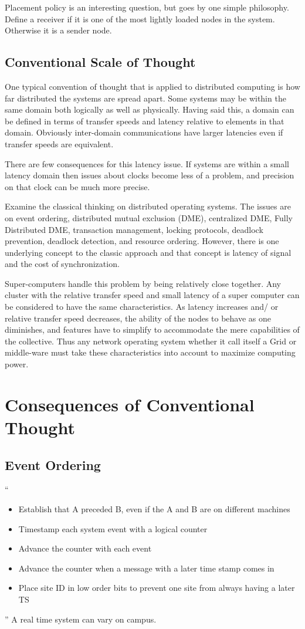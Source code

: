 \documentclass[11pt]{article}
\begin{document}
Placement policy is an interesting question, but goes by one simple philosophy.  Define a receiver if it is one of the most lightly loaded nodes in the system.   Otherwise it is a sender node.  

\subsection {Conventional Scale of Thought}
One typical convention of thought that is applied to distributed computing is how far distributed the systems are spread apart.  Some systems may be within the same domain both logically as well as physically.    Having said this, a domain can be defined in terms of transfer speeds and latency relative to elements in that domain.   Obviously inter-domain communications have larger latencies even if transfer speeds are equivalent.     

There are few consequences for this latency issue.  If systems are within a small latency domain then issues about clocks become less of a problem, and precision on that clock can be much more precise.  

Examine the classical thinking on distributed operating systems.  The issues are on event ordering, distributed mutual exclusion (DME), centralized DME, Fully Distributed DME,  transaction management,  locking protocols, deadlock prevention, deadlock detection,  and  resource ordering.  However, there is one underlying concept to the classic approach and that concept is latency of signal and the cost of synchronization.   

Super-computers handle this problem by being relatively close together.  Any cluster with the relative transfer speed and small latency of a super computer can be considered to have the same characteristics.    As latency increases and/ or relative transfer speed decreases, the ability of the nodes to behave as one diminishes, and features have to simplify to accommodate the mere capabilities of the collective.    Thus any network operating system whether it call itself a Grid or middle-ware must take these characteristics into account to maximize computing power.  

\section {Consequences of Conventional Thought}
\subsection{Event Ordering}
``
\begin{itemize}
\item Establish that A preceded B, even if the A and B are on different machines
\item Timestamp each system event with a logical counter
\item Advance the counter with each event 
\item Advance the counter when a message with a later time stamp comes in
\item Place site ID in low order bits to prevent one site from always having a later TS
\end{itemize}
''
A real time system can vary on campus.  
\end{document}
